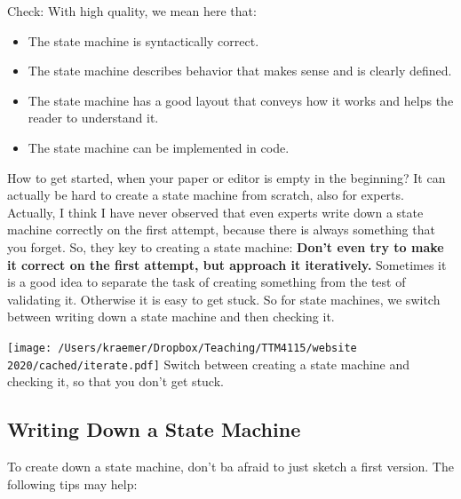\documentclass[10pt, twoside, twocolumn]{book}
\providecommand{\tightlist}{%
  \setlength{\itemsep}{0pt}\setlength{\parskip}{0pt}}
\renewcommand{\caption}{}
\let\origfigure=\figure
\let\endorigfigure=\endfigure
\renewenvironment{figure}[1][]{%
  \origfigure[H]
}{%
  \endorigfigure
}
\begin{document}
Check: With high quality, we mean here that:

\begin{itemize}
\tightlist
\item
  The state machine is syntactically correct.
\item
  The state machine describes behavior that makes sense and is clearly
  defined.
\item
  The state machine has a good layout that conveys how it works and
  helps the reader to understand it.
\item
  The state machine can be implemented in code.
\end{itemize}

How to get started, when your paper or editor is empty in the beginning?
It can actually be hard to create a state machine from scratch, also for
experts. Actually, I think I have never observed that even experts write
down a state machine correctly on the first attempt, because there is
always something that you forget. So, they key to creating a state
machine: \textbf{Don't even try to make it correct on the first attempt,
but approach it iteratively.} Sometimes it is a good idea to separate
the task of creating something from the test of validating it. Otherwise
it is easy to get stuck. So for state machines, we switch between
writing down a state machine and then checking it.

\begin{figure}[htbp]
\begin{center}
\texttt{[image: /Users/kraemer/Dropbox/Teaching/TTM4115/website 2020/cached/iterate.pdf]}%
\caption{Switch between creating a state machine and checking it, so that you
don't get stuck.}
\label{default}
\end{center}
\end{figure}
\hypertarget{writing-down-a-state-machine}{%
\subsection{Writing Down a State
Machine}\label{writing-down-a-state-machine}}

To create down a state machine, don't ba afraid to just sketch a first
version. The following tips may help:
\end{document}
